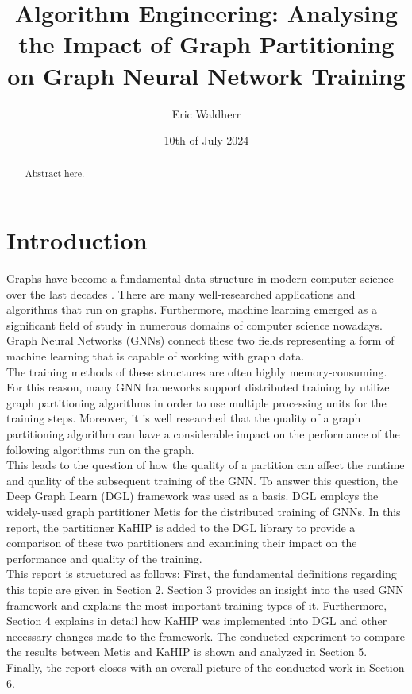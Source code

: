 \documentclass[acmsmall,nonacm,screen,review]{acmart}
\title{Algorithm Engineering: Analysing the Impact of Graph Partitioning on Graph Neural Network Training}
\author{Eric Waldherr}
\affiliation{%
  \institution{Heidelberg University}
  \streetaddress{Im Neuenheimer Feld 205}
  \city{Heidelberg}
  \state{Baden-Württemberg}
  \country{Germany}
  \postcode{69120}
}
\date{10th of July 2024}
\begin{document}
\begin{abstract}
Abstract here.
\end{abstract}
\maketitle

\section{Introduction}
Graphs have become a fundamental data structure in modern computer science over the last decades \cite{Junghanns2017}. There are many well-researched applications and algorithms that run on graphs. Furthermore, machine learning emerged as a significant field of study in numerous domains of computer science nowadays. Graph Neural Networks (GNNs) connect these two fields representing a form of machine learning that is capable of working with graph data. \\
The training methods of these structures are often highly memory-consuming. For this reason, many GNN frameworks support distributed training by utilize graph partitioning algorithms in order to use multiple processing units for the training steps. Moreover, it is well researched that the quality of a graph partitioning algorithm can have a considerable impact on the performance of the following algorithms run on the graph. \\
This leads to the question of how the quality of a partition can affect the runtime and quality of the subsequent training of the GNN. To answer this question, the Deep Graph Learn (DGL) framework \cite{DGL} was used as a basis. DGL employs the widely-used graph partitioner Metis \cite{Metis} for the distributed training of GNNs. In this report, the partitioner KaHIP \cite{KaHIP} is added to the DGL library to provide a comparison of these two partitioners and examining their impact on the performance and quality of the training. \\  
This report is structured as follows: First, the fundamental definitions regarding this topic are given in Section 2. Section 3 provides an insight into the used GNN framework and explains the most important training types of it. Furthermore, Section 4 explains in detail how KaHIP was implemented into DGL and other necessary changes made to the framework. The conducted experiment to compare the results between Metis and KaHIP is shown and analyzed in Section 5. Finally, the report closes with an overall picture of the conducted work in Section 6. 
\end{document}

